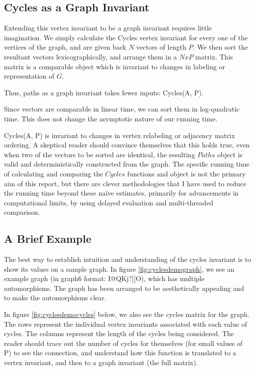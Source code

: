 \subsection{Cycles as a Graph Invariant}

Extending this vertex invariant to be a graph invariant requires little imagination. 
We simply calculate the Cycles vertex invariant for every one of the vertices of the graph, and are given back $N$ vectors of length $P$.
We then sort the resultant vectors lexicographically, and arrange them in a $NxP$ matrix.
This matrix is a comparable object which is invariant to changes in labeling or representation of $G$.

Thus, paths as a graph invariant takes fewer inputs: Cycles(A, P).

Since vectors are comparable in linear time, we can sort them in log-quadratic time.
This does not change the asymptotic nature of our running time.

Cycles(A, P) is invariant to changes in vertex relabeling or adjacency matrix ordering.
A skeptical reader should convince themselves that this holds true, even when two of the vectors to be sorted are identical, the resulting $Paths$ object is valid and deterministically constructed from the graph.
The specific running time of calculating and comparing the $Cycles$ functions and object is not the primary aim of this report, but there are clever methodologies that I have used to reduce the running time beyond these na\"{i}ve estimates, primarily for advancements in computational limits, by using delayed evaluation and multi-threaded comparison.

\subsection{A Brief Example}

The best way to establish intuition and understanding of the cycles invariant is to show its values on a sample graph.
In figure \ref{fig:cyclesdemograph}, we see an example graph (in graph6 format: I@QKj?]]O), which has multiple automorphisms.
The graph has been arranged to be aesthetically appealing and to make the automorphisms clear.

In figure \ref{fig:cyclesdemocycles} below, we also see the cycles matrix for the graph.
The rows represent the individual vertex invariants associated with each value of cycles.
The columns represent the length of the cycles being considered.
The reader should trace out the number of cycles for themselves (for small values of P) to see the connection, and understand how this function is translated to a vertex invariant, and then to a graph invariant (the full matrix).

